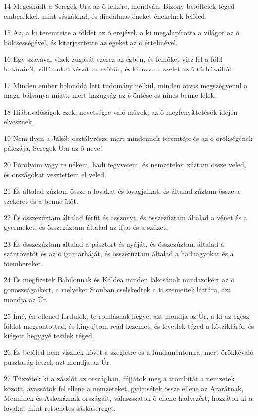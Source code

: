 \par 14 Megesküdt a Seregek Ura az õ lelkére, mondván: Bizony betöltelek téged emberekkel, mint sáskákkal, és diadalmas éneket énekelnek felõled.
\par 15 Az, a ki teremtette a földet az õ erejével, a ki megalapította a világot az õ bölcsességével, és kiterjesztette az egeket az õ értelmével.
\par 16 Egy szavával vizek zúgását szerez az égben, és felhõket visz fel a föld határairól, villámokat készít az esõhöz, és kihozza a szelet az õ tárházaiból.
\par 17 Minden ember bolonddá lett tudomány nélkül, minden ötvös megszégyenül a maga bálványa miatt, mert hazugság az õ öntése és nincs benne lélek.
\par 18 Hiábavalóságok ezek, nevetségre való mûvek, az õ megfenyíttetésök idején elvesznek.
\par 19 Nem ilyen a Jákób osztályrésze mert mindennek teremtõje és az õ örökségének pálczája, Seregek Ura az õ neve!
\par 20 Põrölyöm vagy te nékem, hadi fegyverem, és nemzeteket zúztam össze veled, és országokat vesztettem el veled.
\par 21 És általad zúztam össze a lovakat és lovagjaikat, és általad zúztam össze a szekeret és a benne ülõt.
\par 22 És összezúztam általad férfit és asszonyt, és összezúztam általad a vénet és a gyermeket, és összezúztam általad az ifjat és a szûzet,
\par 23 És összezúztam általad a pásztort és nyáját, és összezúztam általad a szántóvetõt és az õ igamarháját, és összezúztam általad a hadnagyokat és a fõembereket.
\par 24 És megfizetek Babilonnak és Káldea minden lakosának mindazokért az õ gonoszságaikért, a melyeket Sionban cselekedtek a ti szemeitek láttára, azt mondja az Úr.
\par 25 Ímé, én ellened fordulok, te romlásnak hegye, azt mondja az Úr, a ki az egész földet megrontottad, és kinyújtom reád kezemet, és levetlek téged a kõszikláról, és kiégett hegygyé teszlek téged.
\par 26 És belõled nem visznek követ a szegletre és a fundamentomra, mert örökkévaló pusztaság leszel, azt mondja az Úr.
\par 27 Tûzzétek ki a zászlót az országban, fújjátok meg a trombitát a nemzetek között, avassátok fel ellene a nemzeteket, gyûjtsétek össze ellene az Ararátnak, Menninek és Askenáznak országait, válaszszatok õ ellene hadvezért, hozzátok ki a lovakat mint rettenetes sáskasereget.
